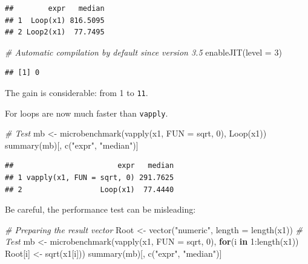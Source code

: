 \documentclass[
  12pt,
  american,
  a4paper,
  extrafontsizes,onecolumn,openright
  ]{memoir}
\newenvironment{Shaded}{\begin{snugshade}}{\end{snugshade}}
\newcommand{\AttributeTok}[1]{\textcolor[rgb]{0.77,0.63,0.00}{#1}}
\newcommand{\CommentTok}[1]{\textcolor[rgb]{0.56,0.35,0.01}{\textit{#1}}}
\newcommand{\ControlFlowTok}[1]{\textcolor[rgb]{0.13,0.29,0.53}{\textbf{#1}}}
\newcommand{\DecValTok}[1]{\textcolor[rgb]{0.00,0.00,0.81}{#1}}
\newcommand{\FunctionTok}[1]{\textcolor[rgb]{0.00,0.00,0.00}{#1}}
\newcommand{\NormalTok}[1]{#1}
\newcommand{\OtherTok}[1]{\textcolor[rgb]{0.56,0.35,0.01}{#1}}
\newcommand{\SpecialCharTok}[1]{\textcolor[rgb]{0.00,0.00,0.00}{#1}}
\newcommand{\StringTok}[1]{\textcolor[rgb]{0.31,0.60,0.02}{#1}}
\newlength{\rf}
\begin{document}
\begin{verbatim}
##        expr   median
## 1  Loop(x1) 816.5095
## 2 Loop2(x1)  77.7495
\end{verbatim}

\begin{Shaded}
\begin{Highlighting}[]
\CommentTok{\# Automatic compilation by default since version 3.5}
\FunctionTok{enableJIT}\NormalTok{(}\AttributeTok{level =} \DecValTok{3}\NormalTok{)}
\end{Highlighting}
\end{Shaded}

\begin{verbatim}
## [1] 0
\end{verbatim}

\normalsize

The gain is considerable: from 1 to \texttt{11}.

For loops are now much faster than \texttt{vapply}.

\scriptsize

\begin{Shaded}
\begin{Highlighting}[]
\CommentTok{\# Test}
\NormalTok{mb }\OtherTok{\textless{}{-}} \FunctionTok{microbenchmark}\NormalTok{(}\FunctionTok{vapply}\NormalTok{(x1, }\AttributeTok{FUN =}\NormalTok{ sqrt, }\DecValTok{0}\NormalTok{), }\FunctionTok{Loop}\NormalTok{(x1))}
\FunctionTok{summary}\NormalTok{(mb)[, }\FunctionTok{c}\NormalTok{(}\StringTok{"expr"}\NormalTok{, }\StringTok{"median"}\NormalTok{)]}
\end{Highlighting}
\end{Shaded}

\begin{verbatim}
##                        expr   median
## 1 vapply(x1, FUN = sqrt, 0) 291.7625
## 2                  Loop(x1)  77.4440
\end{verbatim}

\normalsize

Be careful, the performance test can be misleading:

\scriptsize

\begin{Shaded}
\begin{Highlighting}[]
\CommentTok{\# Preparing the result vector}
\NormalTok{Root }\OtherTok{\textless{}{-}} \FunctionTok{vector}\NormalTok{(}\StringTok{"numeric"}\NormalTok{, }\AttributeTok{length =} \FunctionTok{length}\NormalTok{(x1))}
\CommentTok{\# Test}
\NormalTok{mb }\OtherTok{\textless{}{-}} \FunctionTok{microbenchmark}\NormalTok{(}\FunctionTok{vapply}\NormalTok{(x1, }\AttributeTok{FUN =}\NormalTok{ sqrt, }\DecValTok{0}\NormalTok{), }
                     \ControlFlowTok{for}\NormalTok{(i }\ControlFlowTok{in} \DecValTok{1}\SpecialCharTok{:}\FunctionTok{length}\NormalTok{(x1)) }
\NormalTok{                       Root[i] }\OtherTok{\textless{}{-}} \FunctionTok{sqrt}\NormalTok{(x1[i]))}
\FunctionTok{summary}\NormalTok{(mb)[, }\FunctionTok{c}\NormalTok{(}\StringTok{"expr"}\NormalTok{, }\StringTok{"median"}\NormalTok{)]}
\end{Highlighting}
\end{Shaded}
\end{document}
